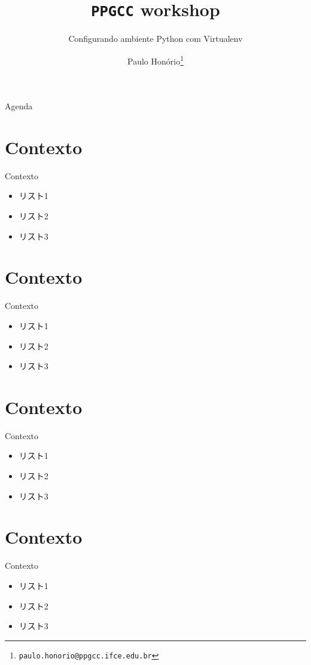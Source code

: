 \documentclass{beamer}
\title{\texttt{PPGCC} workshop}
\subtitle{Configurando ambiente Python com Virtualenv}
\author{Paulo Honório\footnote{\texttt{paulo.honorio@ppgcc.ifce.edu.br}}}
\begin{document}
\begin{frame}
  \maketitle
\end{frame}

\begin{frame}{Agenda}
  \tableofcontents
\end{frame}

\section{Contexto}
\begin{frame}{Contexto}
 \begin{itemize}
  \item リスト1\pause
  \item リスト2\pause
  \item リスト3
  \end{itemize}
\end{frame}

\section{Contexto}
\begin{frame}{Contexto}
 \begin{itemize}
  \item リスト1\pause
  \item リスト2\pause
  \item リスト3
  \end{itemize}
\end{frame}


\section{Contexto}
\begin{frame}{Contexto}
 \begin{itemize}
  \item リスト1\pause
  \item リスト2\pause
  \item リスト3
  \end{itemize}
\end{frame}
\section{Contexto}
\begin{frame}{Contexto}
 \begin{itemize}
  \item リスト1\pause
  \item リスト2\pause
  \item リスト3
  \end{itemize}
\end{frame}
\end{document}
